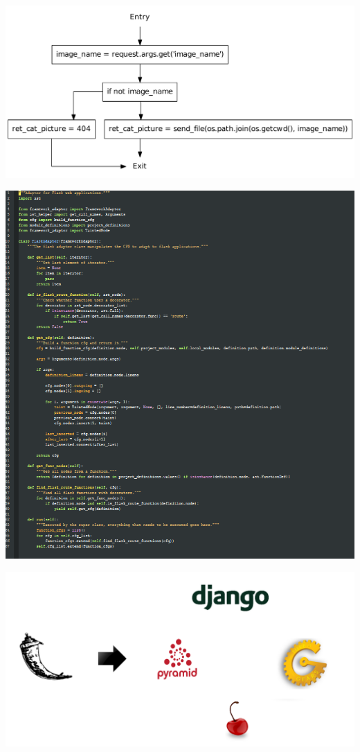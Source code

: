\begin{frame}[plain]
  \center
  \includegraphics[height=0.6\textheight]{graphics/cfg_path_traversal.pdf}
\end{frame}


\begin{frame}[plain]
  \center
  \includegraphics[height=\textheight]{graphics/flask_adaptor_code.png}
\end{frame}


\begin{frame}
  \center
  \includegraphics[width=\textwidth]{graphics/adaptor}
\end{frame}
